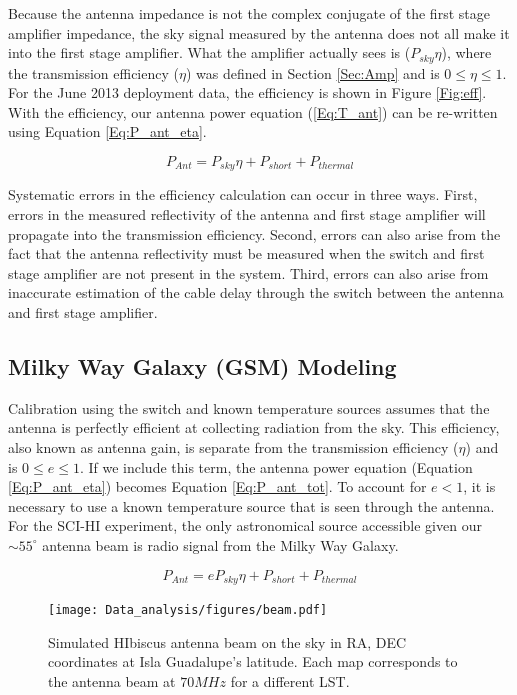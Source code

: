 Because the antenna impedance is not the complex conjugate of the first stage amplifier impedance, the sky signal measured by the antenna does not all make it into the first stage amplifier. What the amplifier actually sees is ($P_{sky}\eta$), where the transmission efficiency ($\eta$) was defined in Section \ref{Sec:Amp} and is $0 \leq \eta \leq 1$. For the June 2013 deployment data, the efficiency is shown in Figure \ref{Fig:eff}. With the efficiency, our antenna power equation (\ref{Eq:T_ant}) can be re-written using Equation \ref{Eq:P_ant_eta}.

\begin{equation}\label{Eq:P_ant_eta}
P_{Ant} = P_{sky} \eta  + P_{short} +P_{thermal}
\end{equation}

Systematic errors in the efficiency calculation can occur in three ways. First, errors in the measured reflectivity of the antenna and first stage amplifier will propagate into the transmission efficiency. Second, errors can also arise from the fact that the antenna reflectivity must be measured when the switch and first stage amplifier are not present in the system. Third, errors can also arise from inaccurate estimation of the cable delay through the switch between the antenna and first stage amplifier. 

\subsection{Milky Way Galaxy (GSM) Modeling} \label{Sec:model}

Calibration using the switch and known temperature sources assumes that the antenna is perfectly efficient at collecting radiation from the sky. This efficiency, also known as antenna gain, is separate from the transmission efficiency ($\eta$) and is $0 \leq e \leq 1$. If we include this term, the antenna power equation (Equation \ref{Eq:P_ant_eta}) becomes Equation \ref{Eq:P_ant_tot}. To account for $e<1$, it is necessary to use a known temperature source that is seen through the antenna. For the SCI-HI experiment, the only astronomical source accessible given our $\sim 55 ^\circ$ antenna beam is radio signal from the Milky Way Galaxy. 

\begin{equation}\label{Eq:P_ant_tot}
P_{Ant} = e P_{sky} \eta + P_{short} + P_{thermal}
\end{equation}



\begin{figure}[htb]
\begin{center}
\texttt{[image: Data\_analysis/figures/beam.pdf]}
\caption{Simulated HIbiscus antenna beam on the sky in RA, DEC coordinates at Isla Guadalupe's latitude. Each map corresponds to the antenna beam at $70 MHz$ for a different LST. }
\label{Fig:HIbiscus_beam}
\end{center}
\end{figure}

